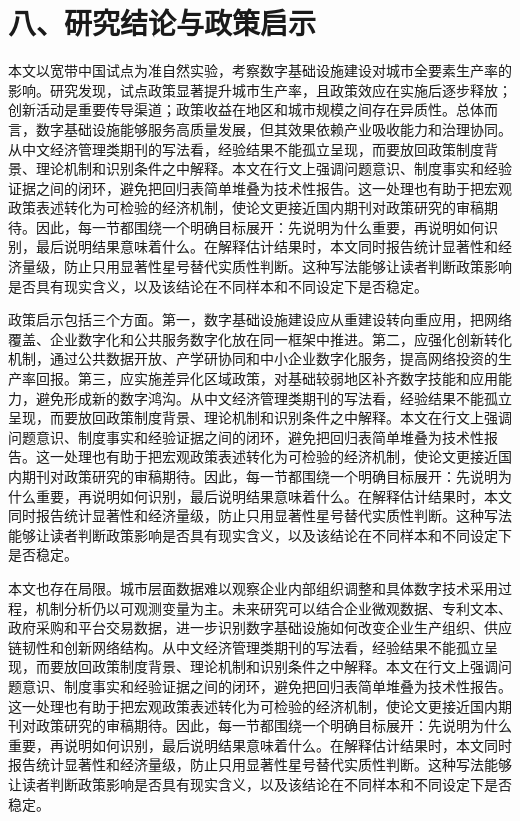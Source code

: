 \documentclass[12pt,a4paper]{article}
\begin{document}
\section*{八、研究结论与政策启示}
本文以宽带中国试点为准自然实验，考察数字基础设施建设对城市全要素生产率的影响。研究发现，试点政策显著提升城市生产率，且政策效应在实施后逐步释放；创新活动是重要传导渠道；政策收益在地区和城市规模之间存在异质性。总体而言，数字基础设施能够服务高质量发展，但其效果依赖产业吸收能力和治理协同。从中文经济管理类期刊的写法看，经验结果不能孤立呈现，而要放回政策制度背景、理论机制和识别条件之中解释。本文在行文上强调问题意识、制度事实和经验证据之间的闭环，避免把回归表简单堆叠为技术性报告。这一处理也有助于把宏观政策表述转化为可检验的经济机制，使论文更接近国内期刊对政策研究的审稿期待。因此，每一节都围绕一个明确目标展开：先说明为什么重要，再说明如何识别，最后说明结果意味着什么。在解释估计结果时，本文同时报告统计显著性和经济量级，防止只用显著性星号替代实质性判断。这种写法能够让读者判断政策影响是否具有现实含义，以及该结论在不同样本和不同设定下是否稳定。

政策启示包括三个方面。第一，数字基础设施建设应从重建设转向重应用，把网络覆盖、企业数字化和公共服务数字化放在同一框架中推进。第二，应强化创新转化机制，通过公共数据开放、产学研协同和中小企业数字化服务，提高网络投资的生产率回报。第三，应实施差异化区域政策，对基础较弱地区补齐数字技能和应用能力，避免形成新的数字鸿沟。从中文经济管理类期刊的写法看，经验结果不能孤立呈现，而要放回政策制度背景、理论机制和识别条件之中解释。本文在行文上强调问题意识、制度事实和经验证据之间的闭环，避免把回归表简单堆叠为技术性报告。这一处理也有助于把宏观政策表述转化为可检验的经济机制，使论文更接近国内期刊对政策研究的审稿期待。因此，每一节都围绕一个明确目标展开：先说明为什么重要，再说明如何识别，最后说明结果意味着什么。在解释估计结果时，本文同时报告统计显著性和经济量级，防止只用显著性星号替代实质性判断。这种写法能够让读者判断政策影响是否具有现实含义，以及该结论在不同样本和不同设定下是否稳定。

本文也存在局限。城市层面数据难以观察企业内部组织调整和具体数字技术采用过程，机制分析仍以可观测变量为主。未来研究可以结合企业微观数据、专利文本、政府采购和平台交易数据，进一步识别数字基础设施如何改变企业生产组织、供应链韧性和创新网络结构。从中文经济管理类期刊的写法看，经验结果不能孤立呈现，而要放回政策制度背景、理论机制和识别条件之中解释。本文在行文上强调问题意识、制度事实和经验证据之间的闭环，避免把回归表简单堆叠为技术性报告。这一处理也有助于把宏观政策表述转化为可检验的经济机制，使论文更接近国内期刊对政策研究的审稿期待。因此，每一节都围绕一个明确目标展开：先说明为什么重要，再说明如何识别，最后说明结果意味着什么。在解释估计结果时，本文同时报告统计显著性和经济量级，防止只用显著性星号替代实质性判断。这种写法能够让读者判断政策影响是否具有现实含义，以及该结论在不同样本和不同设定下是否稳定。
\end{document}
